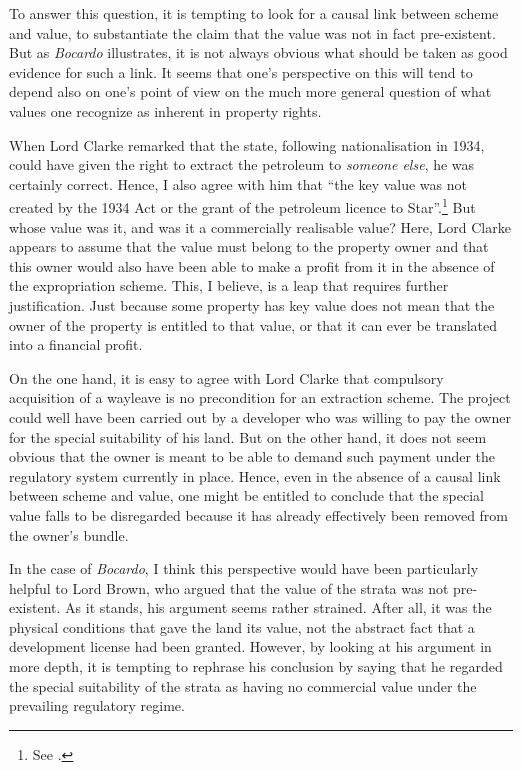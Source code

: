 To answer this question, it is tempting to look for a causal link between scheme and value, to substantiate the claim that the value was not in fact pre-existent. But as \emph{Bocardo} illustrates, it is not always obvious what should be taken as good evidence for such a link. It seems that one's perspective on this will tend to depend also on one's point of view on the much more general question of what values one recognize as inherent in property rights.

When Lord Clarke remarked that the state, following nationalisation in 1934, could have given the right to extract the petroleum to \emph{someone else}, he was certainly correct. Hence, I also agree with him that ``the key value was not created by the 1934 Act or the grant of the petroleum licence to Star''.\footnote{See \cite[163]{bocardo10}.} But whose value was it, and was it a commercially realisable value? Here, Lord Clarke appears to assume that the value must belong to the property owner and that this owner would also have been able to make a profit from it in the absence of the expropriation scheme. This, I believe, is a leap that requires further justification. Just because some property has key value does not mean that the owner of the property is entitled to that value, or that it can ever be translated into a financial profit.

On the one hand, it is easy to agree with Lord Clarke that compulsory acquisition of a wayleave is no precondition for an extraction scheme. The project could well have been carried out by a developer who was willing to pay the owner for the special suitability of his land. But on the other hand, it does not seem obvious that the owner is meant to be able to demand such payment under the regulatory system currently in place. Hence, even in the absence of a causal link between scheme and value, one might be entitled to conclude that the special value falls to be disregarded because it has already effectively been removed from the owner's bundle.

In the case of {\it Bocardo}, I think this perspective would have been particularly helpful to Lord Brown, who argued that the value of the strata was not pre-existent. As it stands, his argument seems rather strained. After all, it was the physical conditions that gave the land its value, not the abstract fact that a development license had been granted. However, by looking at his argument in more depth, it is tempting to rephrase his conclusion by saying that he regarded the special suitability of the strata as having no commercial value under the prevailing regulatory regime.

